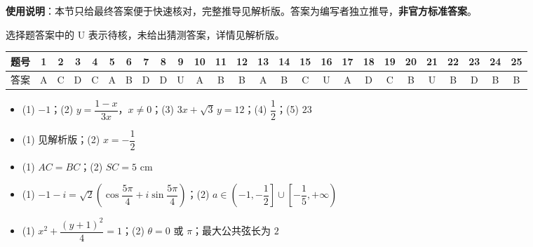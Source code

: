 
\begin{gknotice}
\textbf{使用说明}：本节只给最终答案便于快速核对，完整推导见解析版。答案为编写者独立推导，\textbf{非官方标准答案}。
\end{gknotice}

\begin{gknotice}
选择题答案中的 U 表示待核，未给出猜测答案，详情见解析版。
\end{gknotice}

\begin{center}\begin{tabular}{cccccccccccccccccccccccccc}
\toprule
题号 & 1 & 2 & 3 & 4 & 5 & 6 & 7 & 8 & 9 & 10 & 11 & 12 & 13 & 14 & 15 & 16 & 17 & 18 & 19 & 20 & 21 & 22 & 23 & 24 & 25 \\
\midrule
答案 & A & C & D & C & A & B & D & D & U & A & B & B & A & B & C & U & A & D & C & B & U & B & D & B & B \\
\bottomrule
\end{tabular}\end{center}

\begin{itemize}[leftmargin=2.6em]
  \item[\textbf{一.}] (1) $-1$；(2) $y=\dfrac{1-x}{3x}$，$x\ne0$；(3) $3x+\sqrt3\,y=12$；(4) $\dfrac12$；(5) $23$
\end{itemize}

\begin{itemize}[leftmargin=2.6em]
  \item[\textbf{二.}] (1) 见解析版；(2) $x=-\dfrac12$
  \item[\textbf{三.}] (1) $AC=BC$；(2) $SC=5\text{ cm}$
  \item[\textbf{四.}] (1) $-1-i=\sqrt2\left(\cos\dfrac{5\pi}{4}+i\sin\dfrac{5\pi}{4}\right)$；(2) $a\in\left(-1,-\dfrac12\right]\cup\left[-\dfrac15,+\infty\right)$
  \item[\textbf{五.}] (1) $x^2+\dfrac{(y+1)^2}{4}=1$；(2) $\theta=0$ 或 $\pi$；最大公共弦长为 $2$
\end{itemize}
